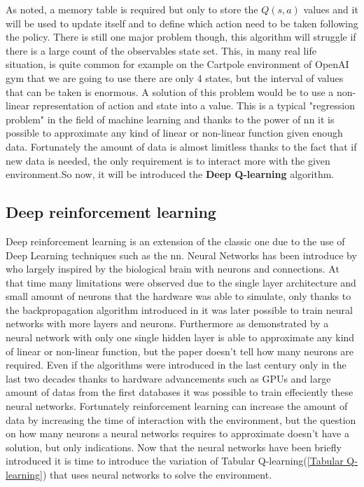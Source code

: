As noted, a memory table is required but only to store the $Q(s,a)$ values and it will be used to update itself and to define which action need to be taken following the policy.
There is still one major problem though, this algorithm will struggle if there is a large count of the observables state set. This, in many real life situation, is quite common for example on the Cartpole environment of OpenAI gym that we are going to use there are only 4 states, but the interval of values that can be taken is enormous.
A solution of this problem would be to use a non-linear representation of action and state into a value. This is a typical "regression problem" in the field of machine learning and thanks to the power of \acrfull{nn} it is possible to approximate any kind of linear or non-linear function given enough data. Fortunately the amount of data is almost limitless thanks to the fact that if new data is needed, the only requirement is to interact more with the given environment.So now, it will be introduced the \textbf{Deep Q-learning} algorithm.

\subsection{Deep reinforcement learning}
Deep reinforcement learning is an extension of the classic one due to the use of Deep Learning techniques such as the \acrfull{nn}. Neural Networks has been introduce by \cite{Rosenblatt1958ThePA} who largely inspired by the biological brain with neurons and connections. At that time many limitations were observed due to the single layer architecture and small amount of neurons that the hardware was able to simulate, only thanks to the backpropagation algorithm introduced in \cite{backpropagation} it was later possible to train neural networks with more layers and neurons. Furthermore as demonstrated by \cite{universals} a neural network with only one single hidden layer is able to approximate any kind of linear or non-linear function, but the paper doesn't tell how many neurons are required. 
Even if the algorithms were introduced in the last century only in the last two decades thanks to hardware advancements such as GPUs and large amount of datas from the first databases it was possible to train effeciently these neural networks.
Fortunately reinforcement learning can increase the amount of data by increasing the time of interaction with the environment, but the question on how many neurons a neural networks requires to approximate doesn't have a solution, but only indications.
Now that the neural networks have been briefly introduced it is time to introduce the variation of Tabular Q-learning(\ref{Tabular Q-learning}) that uses neural networks to solve the environment.
